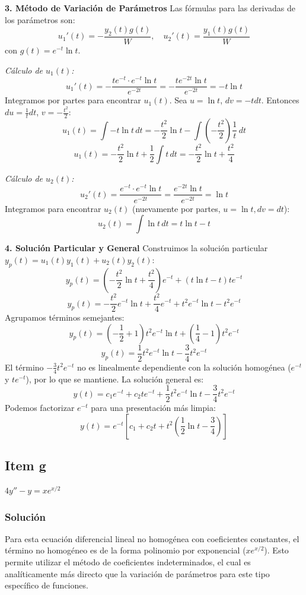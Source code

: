 \documentclass[a4paper]{article}
\begin{document}
\textbf{3. Método de Variación de Parámetros}
Las fórmulas para las derivadas de los parámetros son:
$$
u_1'(t) = -\frac{y_2(t) g(t)}{W}, \quad u_2'(t) = \frac{y_1(t) g(t)}{W}
$$
con $g(t) = e^{-t} \ln t$.

\textit{Cálculo de $u_1(t)$:}
$$
u_1'(t) = -\frac{t e^{-t} \cdot e^{-t} \ln t}{e^{-2t}} = -\frac{t e^{-2t} \ln t}{e^{-2t}} = -t \ln t
$$
Integramos por partes para encontrar $u_1(t)$. Sea $u = \ln t$, $dv = -t dt$. Entonces $du = \frac{1}{t} dt$, $v = -\frac{t^2}{2}$:
$$
u_1(t) = \int -t \ln t \, dt = -\frac{t^2}{2} \ln t - \int \left( -\frac{t^2}{2} \right) \frac{1}{t} \, dt
$$
$$
u_1(t) = -\frac{t^2}{2} \ln t + \frac{1}{2} \int t \, dt = -\frac{t^2}{2} \ln t + \frac{t^2}{4}
$$

\textit{Cálculo de $u_2(t)$:}
$$
u_2'(t) = \frac{e^{-t} \cdot e^{-t} \ln t}{e^{-2t}} = \frac{e^{-2t} \ln t}{e^{-2t}} = \ln t
$$
Integramos para encontrar $u_2(t)$ (nuevamente por partes, $u=\ln t, dv=dt$):
$$
u_2(t) = \int \ln t \, dt = t \ln t - t
$$

\textbf{4. Solución Particular y General}
Construimos la solución particular $y_p(t) = u_1(t)y_1(t) + u_2(t)y_2(t)$:
$$
y_p(t) = \left( -\frac{t^2}{2} \ln t + \frac{t^2}{4} \right) e^{-t} + (t \ln t - t) t e^{-t}
$$
$$
y_p(t) = -\frac{t^2}{2} e^{-t} \ln t + \frac{t^2}{4} e^{-t} + t^2 e^{-t} \ln t - t^2 e^{-t}
$$
Agrupamos términos semejantes:
$$
y_p(t) = \left( -\frac{1}{2} + 1 \right) t^2 e^{-t} \ln t + \left( \frac{1}{4} - 1 \right) t^2 e^{-t}
$$
$$
y_p(t) = \frac{1}{2} t^2 e^{-t} \ln t - \frac{3}{4} t^2 e^{-t}
$$
El término $-\frac{3}{4} t^2 e^{-t}$ no es linealmente dependiente con la solución homogénea ($e^{-t}$ y $t e^{-t}$), por lo que se mantiene. La solución general es:
$$
y(t) = c_1 e^{-t} + c_2 t e^{-t} + \frac{1}{2} t^2 e^{-t} \ln t - \frac{3}{4} t^2 e^{-t}
$$
Podemos factorizar $e^{-t}$ para una presentación más limpia:
$$
y(t) = e^{-t} \left[ c_1 + c_2 t + t^2 \left( \frac{1}{2} \ln t - \frac{3}{4} \right) \right]
$$

\subsection{Item g}
$4y'' - y = x e^{x/2}$

\subsubsection{Solución}
Para esta ecuación diferencial lineal no homogénea con coeficientes constantes, el término no homogéneo es de la forma polinomio por exponencial ($x e^{x/2}$). Esto permite utilizar el método de coeficientes indeterminados, el cual es analíticamente más directo que la variación de parámetros para este tipo específico de funciones.
\end{document}
